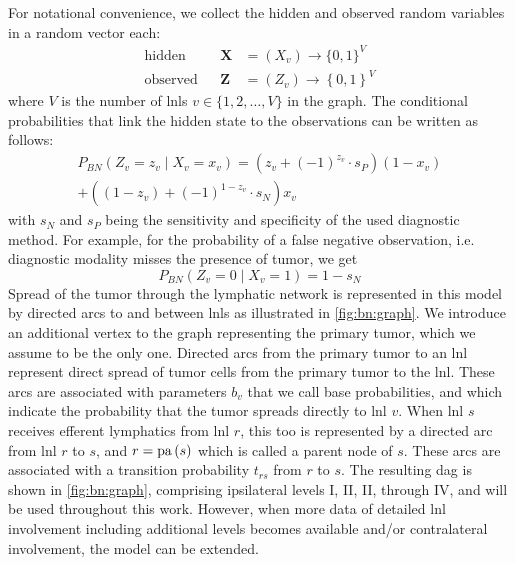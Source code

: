 \documentclass[\relativeRoot/main.tex]{subfiles}
\begin{document}
For notational convenience, we collect the hidden and observed random variables in a random vector each:
%
\begin{equation} \label{eq:bn:variables}
    \begin{aligned}
        \text{hidden}& & \mathbf{X} &= ( X_v ) \rightarrow \{ 0,1 \}^V \\
        \text{observed}& & \mathbf{Z} &= ( Z_v ) \rightarrow \left\{ 0, 1 \right\}^V
    \end{aligned}
\end{equation}
%
where $V$ is the number of \glspl{lnl} $v \in \{ 1,2,\ldots,V \}$ in the graph. The conditional probabilities that link the hidden state to the observations can be written as follows:
%
\begin{multline}
    P_{BN} \left( Z_v = z_v \mid X_v = x_v \right) = \left( z_v + (-1)^{z_v} \cdot s_P \right)(1 - x_v) \\ 
    + \left( (1 - z_v) + (-1)^{1 - z_v} \cdot s_N \right) x_v
\end{multline}
%
with $s_N$ and $s_P$ being the sensitivity and specificity of the used diagnostic method. For example, for the probability of a false negative observation, i.e. diagnostic modality misses the presence of tumor, we get
%
\begin{equation}
    P_{BN} \left( Z_v = 0 \mid X_v = 1 \right) = 1 - s_N
\end{equation}
%
Spread of the tumor through the lymphatic network is represented in this model by directed arcs to and between \glspl{lnl} as illustrated in \cref{fig:bn:graph}. We introduce an additional vertex to the graph representing the primary tumor, which we assume to be the only one. Directed arcs from the primary tumor to an \gls{lnl} represent direct spread of tumor cells from the primary tumor to the \gls{lnl}. These arcs are associated with parameters $b_v$ that we call base probabilities, and which indicate the probability that the tumor spreads directly to \gls{lnl} $v$. When \gls{lnl} $s$ receives efferent lymphatics from \gls{lnl} $r$, this too is represented by a directed arc from \gls{lnl} $r$ to $s$, and $r=\operatorname{pa}{(s)}$ which is called a parent node of $s$. These arcs are associated with a transition probability $t_{rs}$ from $r$ to $s$. The resulting \gls{dag} is shown in \cref{fig:bn:graph}, comprising ipsilateral levels I, II, II, through IV, and will be used throughout this work. However, when more data of detailed \gls{lnl} involvement including additional levels becomes available and/or contralateral involvement, the model can be extended.
\end{document}
